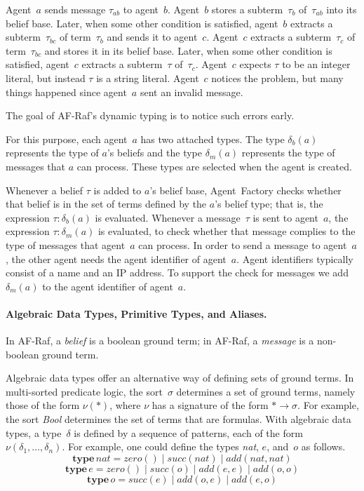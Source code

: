 \documentclass[a4paper,12pt,oneside]{book} %
\theoremstyle{remark}
\theoremstyle{plain}
\newcommand{\rg}[1]{\marginpar{\tiny\raggedright\textcolor{blue}{\bf rg:} #1}}
\begin{document}
\rg{Needs a diagram; otherwise, hard to follow.}
Agent~$a$ sends message $\tau_{ab}$ to agent~$b$. Agent~$b$ stores a
subterm~$\tau_b$ of~$\tau_{ab}$ into its belief base. Later, when some
other condition is satisfied, agent~$b$ extracts a subterm~$\tau_{bc}$ of
term~$\tau_b$ and sends it to agent~$c$. Agent~$c$ extracts a
subterm~$\tau_c$ of term~$\tau_{bc}$ and stores it in its belief base.
Later, when some other condition is satisfied, agent~$c$ extracts a
subterm~$\tau$ of~$\tau_c$. Agent~$c$ expects $\tau$ to be an integer
literal, but instead $\tau$ is a string literal. Agent~$c$ notices the
problem, but many things happened since agent~$a$ sent an invalid message.

The goal of AF-Raf's dynamic typing is to notice such errors early.

For this purpose, each agent~$a$ has two attached types. The type $\delta_b(a)$
represents the type of $a$'s beliefs and the type $\delta_m(a)$ represents the
type of messages that $a$ can process. These types are selected when the agent
is created.

Whenever a belief $\tau$ is added to $a$'s belief base, Agent~Factory checks
whether that belief is in the set of terms defined by the $a$'s belief type;
that is, the expression $\tau:\delta_b(a)$ is evaluated.  Whenever a
message~$\tau$ is sent to agent~$a$, the expression $\tau:\delta_m(a)$ is
evaluated, to check whether that message complies to the type of messages that
agent~$a$ can process. In order to send a message to agent~$a$, the other agent
needs the agent identifier of agent~$a$. Agent identifiers typically consist of
a name and an IP address. To support the check for messages we add
$\delta_m(a)$ to the agent identifier of agent~$a$.

\paragraph{Algebraic Data Types, Primitive Types, and Aliases.}

In AF-Raf, a \emph{belief} is a boolean ground term; in AF-Raf, a
\emph{message} is a non-boolean ground term.

Algebraic data types offer an alternative way of defining sets of ground
terms. In multi-sorted predicate logic, the sort~$\sigma$ determines a set
of ground terms, namely those of the form $\nu(*)$, where $\nu$ has a
signature of the form $*\to\sigma$.  For example, the sort \textit{Bool}
determines the set of terms that are formulas.  With algebraic data types,
a type~$\delta$ is defined by a sequence of patterns, each of the form
$\nu(\delta_1,\ldots,\delta_n)$. For example, one could define the types
\textit{nat}, $e$, and~$o$ as follows.
\[\mathbf{type}\,\mathit{nat} =
  \mathit{zero}()
  \mid\mathit{succ}(\mathit{nat})
  \mid\mathit{add}(\mathit{nat},\mathit{nat})\]
\[\mathbf{type}\,e =
  \mathit{zero}()
  \mid\mathit{succ}(o)
  \mid\mathit{add}(e,e)
  \mid\mathit{add}(o,o)\]
\[\mathbf{type}\,o =
  \mathit{succ}(e)
  \mid\mathit{add}(o,e)
  \mid\mathit{add}(e,o)\]
\end{document}
